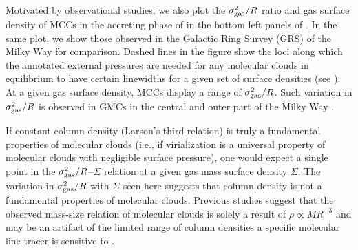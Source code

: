 \IfFileExists{emulateapjlegacy.cls}{\documentclass[iop]{emulateapjlegacy}}{\documentclass[iop]{emulateapj}}
\begin{document}
Motivated by observational studies, we also plot the $\sigma_{\rm gas}^2/R$ ratio and gas surface density of MCCs in the accreting phase of \flower in the bottom left panels of . In the same plot, we show those observed in the Galactic Ring Survey (GRS) of the Milky Way \citep{Heyer09a} for comparison. Dashed lines in the figure show the loci along which the annotated external pressures are needed for any molecular clouds in equilibrium to have certain linewidths for a given set of surface densities (see ). 
At a given gas surface density, MCCs display a range of $\sigma_{\rm gas}^2/R$. 
Such variation in $\sigma_{\rm gas}^2/R$ is observed in GMCs in the central and outer part of the Milky Way \citep{Oka01a, Heyer09a}.

If constant column density (Larson's third relation) is truly a fundamental properties of molecular clouds %
(i.e., if virialization is a universal property of molecular clouds with negligible surface pressure), 
one would expect a single point in the $\sigma_{\rm gas}^2/R$--$\Sigma$ relation at a given gas mass surface density $\Sigma$. 
The variation in $\sigma_{\rm gas}^2/R$ with $\Sigma$ seen here suggests that column density is not a fundamental properties of 
molecular clouds. Previous studies suggest that the observed mass-size relation of molecular clouds 
is solely a result of $\rho\propto M R^{-3}$ and may be an artifact of the limited range of 
column densities a specific molecular line tracer is sensitive to \citep[][]{Ballesteros02a, Ballesteros11a}.
\end{document}
